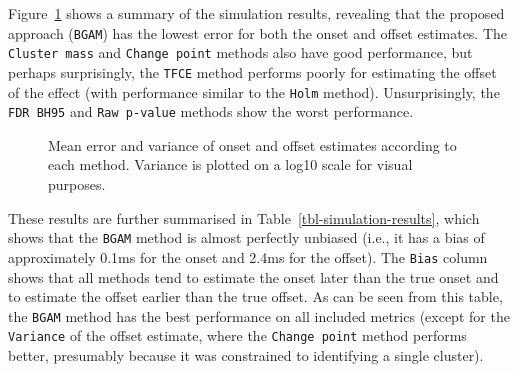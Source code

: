 \documentclass[
  doc,
  floatsintext,
  longtable,
  a4paper,
  nolmodern,
  notxfonts,
  notimes,
  colorlinks=true,linkcolor=blue,citecolor=blue,urlcolor=blue]{apa7}
\begin{document}
Figure~\ref{fig-simulation-results} shows a summary of the simulation
results, revealing that the proposed approach (\texttt{BGAM}) has the
lowest error for both the onset and offset estimates. The
\texttt{Cluster\ mass} and \texttt{Change\ point} methods also have good
performance, but perhaps surprisingly, the \texttt{TFCE} method performs
poorly for estimating the offset of the effect (with performance similar
to the \texttt{Holm} method). Unsurprisingly, the \texttt{FDR\ BH95} and
\texttt{Raw\ p-value} methods show the worst performance.

\begin{figure}[!htb]

\caption{\label{fig-simulation-results}Mean error and variance of onset
and offset estimates according to each method. Variance is plotted on a
log10 scale for visual purposes.}


\end{figure}%

These results are further summarised in
Table~\ref{tbl-simulation-results}, which shows that the \texttt{BGAM}
method is almost perfectly unbiased (i.e., it has a bias of
approximately 0.1ms for the onset and 2.4ms for the offset). The
\texttt{Bias} column shows that all methods tend to estimate the onset
later than the true onset and to estimate the offset earlier than the
true offset. As can be seen from this table, the \texttt{BGAM} method
has the best performance on all included metrics (except for the
\texttt{Variance} of the offset estimate, where the
\texttt{Change\ point} method performs better, presumably because it was
constrained to identifying a single cluster).
\end{document}
